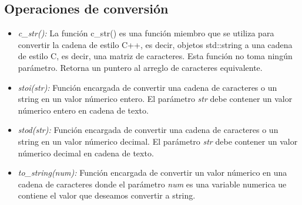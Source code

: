 \subsection{Operaciones de conversión}
\begin{itemize}
	\item \emph{c\_str():} La función c\_str() es una función miembro que se utiliza para convertir la cadena de estilo C++, es decir, objetos std::string a una cadena de estilo C, es decir, una matriz de caracteres. Esta función no toma ningún parámetro. Retorna un puntero al arreglo de caracteres equivalente.
	\item \emph{stoi(str):} Función encargada de convertir una cadena  de caracteres o un string en un valor númerico entero. El parámetro \emph{str} debe contener un valor númerico entero en cadena de texto. 
	\item \emph{stod(str):} Función encargada de convertir una cadena  de caracteres o un string en un valor númerico decimal. El parámetro \emph{str} debe contener un valor númerico decimal en cadena de texto.
	\item \emph{to\_string(num):} Función encargada de convertir un valor númerico en una cadena de caracteres donde el parámetro \emph{num} es una variable numerica ue contiene el valor que deseamos convertir a string.
\end{itemize}